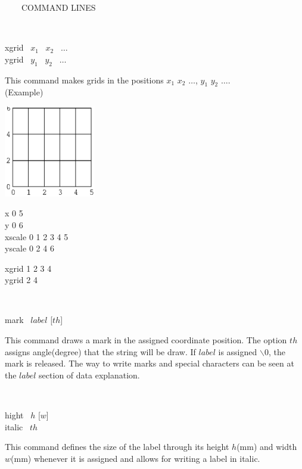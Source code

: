 \begin{qsection}{\ ~~~COMMAND LINES}
\begin{minipage}[t]{9cm}
\end{minipage}\\

\begin{minipage}[t]{5.5cm}
xgrid ~$x_1$ ~$x_2$ ~$\dots$\\
ygrid ~$y_1$ ~$y_2$ ~$\dots$
\end{minipage}
\begin{minipage}[t]{9cm}
This command makes grids in the positions $x_1$ $x_2$ $\dots$,
$y_1$ $y_2$ $\dots$.\\
(Example)\\
\begin{minipage}[t]{4.3cm}
 \includegraphics[width=4cm]{fig/grid.eps}
\end{minipage}
\begin{minipage}[b]{4.5cm}
\baselineskip 5pt
x 0 5\\
y 0 6\\
xscale 0 1 2 3 4 5\\
yscale 0 2 4 6

\vspace{3mm}
xgrid 1 2 3 4\\
ygrid 2 4
\vspace*{1cm}
\end{minipage}
\end{minipage}\\


\begin{minipage}[t]{5.5cm}
mark ~$label$ [$th$]
\end{minipage}
\begin{minipage}[t]{9cm}
This command draws a mark in the assigned coordinate position.
The option $th$ assigns angle(degree) that the string will be draw.
If $label$ is assigned $\backslash 0$, the mark is released.
The way to write marks and special characters can be seen
at the $label$ section of data explanation.
\end{minipage}\\

\begin{minipage}[t]{5.5cm}
hight ~$h$ [$w$]\\
italic ~$th$
\end{minipage}
\begin{minipage}[t]{9cm}
This command defines the size of the label through its
height $h$(mm) and width $w$(mm) whenever it is assigned
and allows for writing a label in italic.
\end{minipage}\\


\end{qsection}
